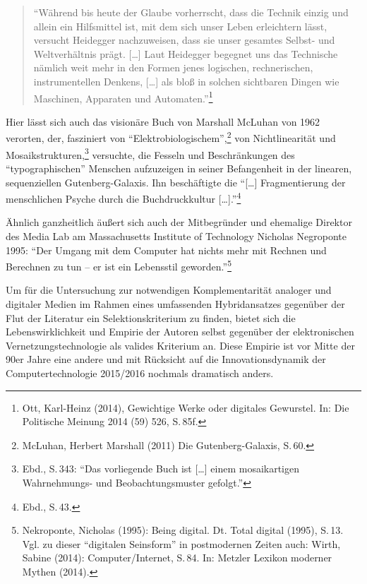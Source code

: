 \documentclass[a4paper,
fontsize=11pt,
oneside,
numbers=noperiodatend,
parskip=half-,
bibliography=totoc,
final
]{scrartcl}
\begin{document}
\begin{quote}
\enquote{Während bis heute der Glaube vorherrscht, dass die Technik
einzig und allein ein Hilfsmittel ist, mit dem sich unser Leben
erleichtern lässt, versucht Heidegger nachzuweisen, dass sie unser
gesamtes Selbst- und Weltverhältnis prägt. {[}\ldots{}{]} Laut Heidegger
begegnet uns das Technische nämlich weit mehr in den Formen jenes
logischen, rechnerischen, instrumentellen Denkens, {[}\ldots{}{]} als
bloß in solchen sichtbaren Dingen wie Maschinen, Apparaten und
Automaten.}\footnote{Ott, Karl-Heinz (2014), Gewichtige Werke oder
  digitales Gewurstel. In: Die Politische Meinung 2014 (59) 526, S.\,85f.}
\end{quote}

Hier lässt sich auch das visionäre Buch von Marshall McLuhan von 1962
verorten, der, fasziniert von \enquote{Elektrobiologischem},\footnote{McLuhan,
  Herbert Marshall (2011) Die Gutenberg-Galaxis, S.\,60.} von
Nichtlinearität und Mosaikstrukturen,\footnote{Ebd., S.\,343:
  \enquote{Das vorliegende Buch ist {[}\ldots{}{]} einem mosaikartigen
  Wahrnehmungs- und Beobachtungsmuster gefolgt.}} versuchte, die Fesseln
und Beschränkungen des \enquote{typographischen} Menschen aufzuzeigen in
seiner Befangenheit in der linearen, sequenziellen Gutenberg-Galaxis.
Ihn beschäftigte die \enquote{{[}\ldots{}{]} Fragmentierung der
menschlichen Psyche durch die Buchdruckkultur {[}\ldots{}{]}.}\footnote{Ebd.,
  S.\,43.}

Ähnlich ganzheitlich äußert sich auch der Mitbegründer und ehemalige
Direktor des Media Lab am Massachusetts Institute of Technology Nicholas
Negroponte 1995: \enquote{Der Umgang mit dem Computer hat nichts mehr
mit Rechnen und Berechnen zu tun -- er ist ein Lebensstil
geworden.}\footnote{Nekroponte, Nicholas (1995): Being digital. Dt.
  Total digital (1995), S.\,13. Vgl. zu dieser \enquote{digitalen
  Seinsform} in postmodernen Zeiten auch: Wirth, Sabine (2014):
  Computer/Internet, S.\,84. In: Metzler Lexikon moderner Mythen (2014).}

Um für die Untersuchung zur notwendigen Komplementarität analoger und
digitaler Medien im Rahmen eines umfassenden Hybridansatzes gegenüber
der Flut der Literatur ein Selektionskriterium zu finden, bietet sich
die Lebenswirklichkeit und Empirie der Autoren selbst gegenüber der
elektronischen Vernetzungstechnologie als valides Kriterium an. Diese
Empirie ist vor Mitte der 90er Jahre eine andere und mit Rücksicht auf
die Innovationsdynamik der Computertechnologie 2015/2016 nochmals
dramatisch anders.
\end{document}

